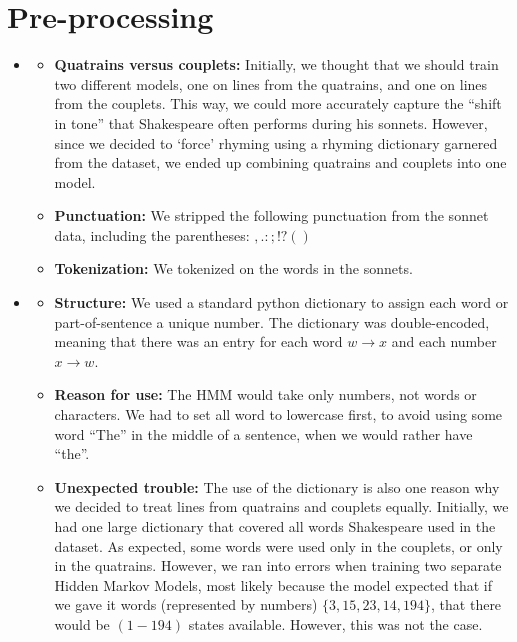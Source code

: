 \section{Pre-processing}
\medskip
\begin{itemize}

    \item {}
    \begin{itemize}
        \item \textbf{Quatrains versus couplets:} Initially, we thought that we should train two different models, one on lines from the quatrains, and one on lines from the couplets. This way, we could more accurately capture the ``shift in tone'' that Shakespeare often performs during his sonnets. However, since we decided to `force' rhyming using a rhyming dictionary garnered from the dataset, we ended up combining quatrains and couplets into one model.
        \item \textbf{Punctuation:} We stripped the following punctuation from the sonnet data, including the parentheses: $,.:;!?()$
        \item \textbf{Tokenization:} We tokenized on the words in the sonnets.
    \end{itemize}
    \item {}
    \begin{itemize}
        \item \textbf{Structure:} We used a standard python dictionary to assign each word or part-of-sentence a unique number. The dictionary was double-encoded, meaning that there was an entry for each word $w \rightarrow x$ and each number $x \rightarrow w$.
        \item \textbf{Reason for use:} The HMM would take only numbers, not words or characters. We had to set all word to lowercase first, to avoid using some word ``The'' in the middle of a sentence, when we would rather have ``the''. 
        \item \textbf{Unexpected trouble:} The use of the dictionary is also one reason why we decided to treat lines from quatrains and couplets equally. Initially, we had one large dictionary that covered all words Shakespeare used in the dataset. As expected, some words were used only in the couplets, or only in the quatrains. However, we ran into errors when training two separate Hidden Markov Models, most likely because the model expected that if we gave it words (represented by numbers) $\{ 3, 15, 23, 14, 194\}$, that there would be $(1-194)$ states available. However, this was not the case. 
    \end{itemize}


\end{itemize}

